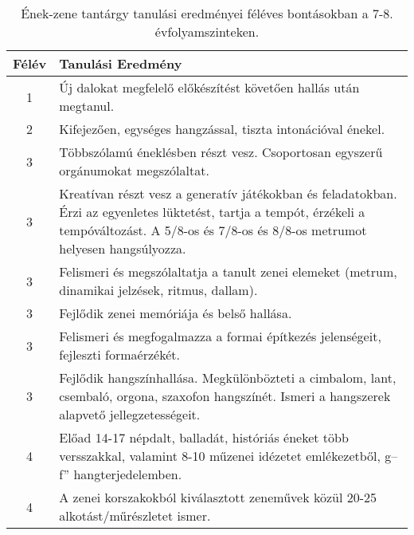        
           \begin{longtable}{c | p{} }
            \caption[Ének-zene 7-8.]{Ének-zene tantárgy tanulási eredményei féléves bontásokban a 7-8. évfolyamszinteken. }  \\

            \textbf{Félév} & \textbf{Tanulási Eredmény} \\
            \hline
            \endhead
                                
                                          1 & Új dalokat megfelelő előkészítést követően hallás után megtanul. \\ \hline
                                          2 &  Kifejezően, egységes hangzással, tiszta intonációval énekel.\\ \hline
                                          3 &  Többszólamú éneklésben részt vesz. Csoportosan egyszerű orgánumokat megszólaltat. \\ \hline
                                          3 &  Kreatívan  részt vesz a generatív játékokban és feladatokban. Érzi az egyenletes lüktetést, tartja a tempót, érzékeli a tempóváltozást. A 5/8-os és 7/8-os és 8/8-os metrumot helyesen hangsúlyozza. \\ \hline
                                          3 &  Felismeri és megszólaltatja a tanult zenei elemeket (metrum, dinamikai jelzések, ritmus, dallam). \\ \hline
                                          3 &  Fejlődik zenei memóriája és belső hallása. \\ \hline
                                          3 &  Felismeri és megfogalmazza a formai építkezés jelenségeit, fejleszti formaérzékét. \\ \hline
                                          3 &  Fejlődik hangszínhallása. Megkülönbözteti a cimbalom, lant, csembaló, orgona, szaxofon hangszínét. Ismeri a hangszerek alapvető jellegzetességeit. \\ \hline
                                      
                                
                                          4 &  Előad 14-17 népdalt, balladát, históriás éneket több versszakkal, valamint 8-10 műzenei idézetet emlékezetből, g–f” hangterjedelemben. \\ \hline
                                          4 &  A zenei korszakokból kiválasztott zeneművek közül 20-25 alkotást/műrészletet ismer. \\ \hline
                                      
                        \end{longtable}
            \clearpage

